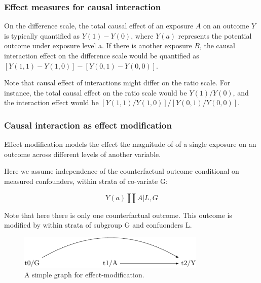 \documentclass[
  singlecolumn]{report}
\begin{document}
\hypertarget{effect-measures-for-causal-interaction}{%
\subsubsection{\texorpdfstring{\textbf{Effect measures for causal
interaction}}{Effect measures for causal interaction}}\label{effect-measures-for-causal-interaction}}

On the difference scale, the total causal effect of an exposure \(A\) on
an outcome \(Y\) is typically quantified as \(Y(1) - Y(0)\), where
\(Y(a)\) represents the potential outcome under exposure level a. If
there is another exposure \(B\), the causal interaction effect on the
difference scale would be quantified as
\([Y(1,1) - Y(1,0)] - [Y(0,1) - Y(0,0)]\).

Note that causal effect of interactions might differ on the ratio scale.
For instance, the total causal effect on the ratio scale would be
\(Y(1) / Y(0)\), and the interaction effect would be
\([Y(1,1) / Y(1,0)] / [Y(0,1) / Y(0,0)]\).

\hypertarget{causal-interaction-as-effect-modification}{%
\subsubsection{\texorpdfstring{\textbf{Causal interaction as effect
modification}}{Causal interaction as effect modification}}\label{causal-interaction-as-effect-modification}}

Effect modification models the effect the magnitude of of a single
exposure on an outcome across different levels of another variable.

Here we assume independence of the counterfactual outcome conditional on
measured confounders, within strata of co-variate G:

\[Y(a) \coprod A | L, G\]

Note that here there is only one counterfactual outcome. This outcome is
modified by within strata of subgroup G and confuonders L.

\begin{figure}

{\centering \includegraphics[width=0.8\textwidth,height=\textheight]{causal-dags_files/figure-pdf/fig-dag-effect-modfication-1.pdf}

}

\caption{\label{fig-dag-effect-modfication}A simple graph for
effect-modification.}

\end{figure}
\end{document}
